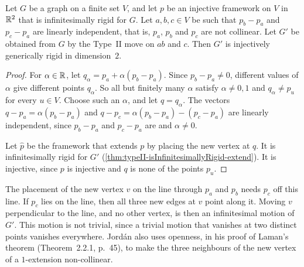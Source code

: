 \begin{theorem}
  \label{thm:typeII-isGenericallyRigidInj-two-of-nonCollinear}
  \leanok
  Let $G$ be a graph on a finite set $V$, and let $p$ be an injective
  framework on $V$ in ${\mathbb{R}}^{2}$ that is infinitesimally rigid for $G$.
  Let $a, b, c \in V$ be such that $p_b - p_a$ and $p_c - p_a$ are
  linearly independent, that is, $p_a$, $p_b$ and $p_c$ are not
  collinear. Let $G'$ be obtained from $G$ by the Type~II move on $ab$
  and $c$. Then $G'$ is injectively generically rigid in
  dimension~$2$.
\end{theorem}
\begin{proof}
  \leanok
  For $\alpha \in {\mathbb{R}}$, let $q_\alpha = p_a + \alpha (p_b - p_a)$.
  Since $p_b - p_a \ne 0$, different values of $\alpha$ give different
  points $q_\alpha$. So all but finitely many $\alpha$ satisfy
  $\alpha \ne 0, 1$ and $q_\alpha \ne p_u$ for every $u \in V$. Choose such an $\alpha$, and
  let $q = q_\alpha$. The vectors $q - p_a = \alpha (p_b - p_a)$ and
  $q - p_c = \alpha (p_b - p_a) - (p_c - p_a)$ are linearly
  independent, since $p_b - p_a$ and $p_c - p_a$ are and
  $\alpha \ne 0$.

  Let $\hat p$ be the framework that extends $p$ by placing the new
  vertex at $q$. It is infinitesimally rigid for $G'$
  (\cref{thm:typeII-isInfinitesimallyRigid-extend}). It is injective,
  since $p$ is injective and $q$ is none of the points $p_u$.
\end{proof}

The placement of the new vertex $v$ on the line through $p_a$ and
$p_b$ needs $p_c$ off this line. If $p_c$ lies on the line, then all
three new edges at $v$ point along it. Moving $v$ perpendicular to the
line, and no other vertex, is then an infinitesimal motion of $G'$.
This motion is not trivial, since a trivial motion that vanishes at
two distinct points vanishes everywhere. Jord\'an also uses openness,
in his proof of Laman's theorem (Theorem~2.2.1, p.~45), to make the
three neighbours of the new vertex of a $1$-extension non-collinear.

